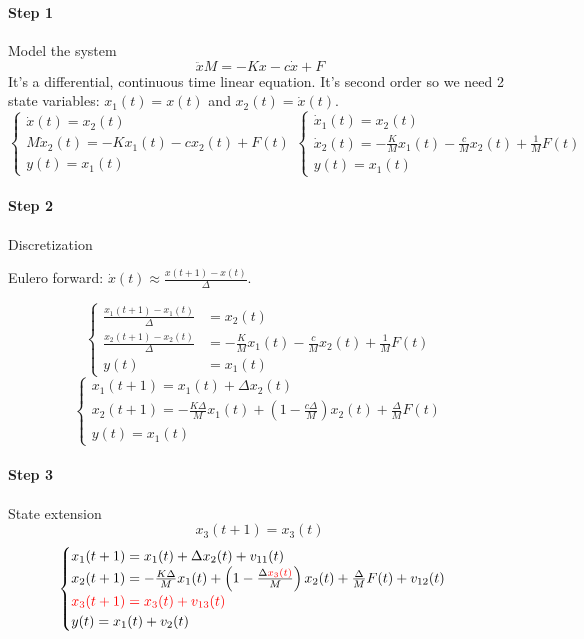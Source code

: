 \begin{example}
    \paragraph{Step 1} Model the system
    \[
        \ddot{x}M = -Kx - c\dot{x} + F
    \]
    It's a differential, continuous time linear equation.
    It's second order so we need 2 state variables: $x_1(t) = x(t)$ and $x_2(t) = \dot{x}(t)$.
    \[
        \begin{cases}
            \dot{x}(t) = x_2(t) \\
            M\dot{x}_2(t) = -Kx_1(t) -cx_2(t) + F(t) \\
            y(t) = x_1(t)
        \end{cases}
        \begin{cases}
            \dot{x}_1(t) = x_2(t) \\
            \dot{x}_2(t) = -\frac{K}{M} x_1(t) - \frac{c}{M} x_2(t) + \frac{1}{M}F(t) \\
            y(t) = x_1(t)
        \end{cases}
    \]

    \paragraph{Step 2} Discretization

    Eulero forward: $\dot{x}(t) \approx \frac{x(t+1)-x(t)}{\Delta}$.

    \[
        \begin{cases}
            \frac{x_1(t+1)-x_1(t)}{\Delta} &= x_2(t) \\
            \frac{x_2(t+1)-x_2(t)}{\Delta} &= -\frac{K}{M} x_1(t) - \frac{c}{M} x_2(t) + \frac{1}{M}F(t) \\
            y(t) &= x_1(t)
        \end{cases}
    \]
    \[
        \begin{cases}
            x_1(t+1) = x_1(t) + \Delta x_2(t) \\
            x_2(t+1) = -\frac{K\Delta}{M}x_1(t) + \left(1-\frac{c\Delta}{M}\right)x_2(t) + \frac{\Delta}{M}F(t) \\
            y(t) = x_1(t)
        \end{cases}
    \]

    \paragraph{Step 3} State extension
    \[
        x_3(t+1) = x_3(t)
    \]
    \[
        \begin{cases}
            x_1(t+1) = x_1(t) + \Delta x_2(t) + v_{11}(t) \\
            x_2(t+1) = -\frac{K\Delta}{M}x_1(t) + \left(1-\frac{\Delta {\color{red}x_3(t)}}{M}\right)x_2(t) + \frac{\Delta}{M}F(t) + v_{12}(t) \\
            {\color{red}x_3(t+1) = x_3(t) + v_{13}(t)} \\
            y(t) = x_1(t) + v_2(t)
        \end{cases}
    \]


\end{example}
